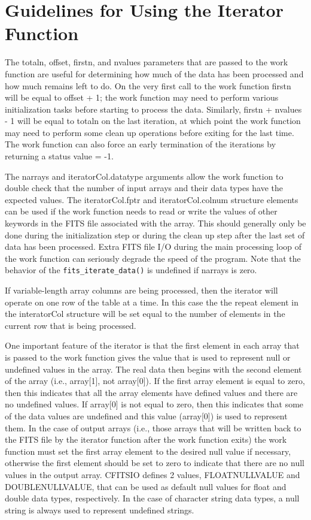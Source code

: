 \documentclass[11pt]{book}
\begin{document}
\section{Guidelines for Using the Iterator Function}

The totaln, offset, firstn, and nvalues parameters that are passed to
the work function are useful for determining how much of the data has
been processed and how much remains left to do.  On the very first call
to the work function firstn will be equal to offset + 1;  the work
function may need to perform various initialization tasks before
starting to  process the data. Similarly, firstn + nvalues - 1 will be
equal to totaln on the last iteration, at which point the work function
may need to perform some clean up operations before exiting for the
last time.  The work function can also force an early termination of
the iterations by returning a status value = -1.

The narrays and iteratorCol.datatype arguments allow the work function
to double check that the number of input arrays and their data types
have the expected values.  The iteratorCol.fptr and iteratorCol.colnum
structure elements can be used if the work function needs to read or
write the values of other keywords in the FITS file associated with
the array.  This should generally only be done during the
initialization step or during the clean up step after the last set of
data has been processed.  Extra FITS file I/O during the main
processing loop of the work function can seriously degrade the speed of
the program.  Note that the behavior of the \verb|fits_iterate_data()|
is undefined if narrays is zero.

If variable-length array columns are being processed, then the iterator
will operate on one row of the table at a time.  In this case the
the repeat element in the interatorCol structure will be set equal to
the number of elements in the current row that is being processed.

One important feature of the iterator is that the first element in each
array that is passed to the work function gives the value that is used
to represent null or undefined values in the array.  The real data then
begins with the second element of the array (i.e., array[1], not
array[0]).  If the first array element is equal to zero, then this
indicates that all the array elements have defined values and there are
no undefined values.  If array[0] is not equal to zero, then this
indicates that some of the data values are undefined and this value
(array[0]) is used to represent them.  In the case of output arrays
(i.e., those arrays that will be written back to the FITS file by the
iterator function after the work function exits) the work function must
set the first array element to the desired null value if necessary,
otherwise the first element should be set to zero to indicate that
there are no null values in the output array.  CFITSIO defines 2
values, FLOATNULLVALUE and DOUBLENULLVALUE, that can be used as default
null values for float and double data types, respectively.  In the case
of character string data types, a null string is always used to
represent undefined strings.
\end{document}
